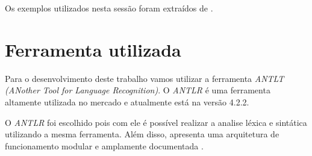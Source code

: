 \documentclass[12pt]{article}
\begin{document}
Os exemplos utilizados nesta sessão foram extraídos de \cite{W3Schools}.

\section{Ferramenta utilizada}

Para o desenvolvimento deste trabalho vamos utilizar a ferramenta \textit{ANTLT (ANother Tool for Language Recognition)}. O \textit{ANTLR} é uma ferramenta altamente utilizada no mercado e atualmente está na versão 4.2.2.

O \textit{ANTLR} foi escolhido pois com ele é possível realizar a analise léxica e sintática utilizando a mesma ferramenta. Além disso, apresenta uma arquitetura de funcionamento modular e amplamente documentada \cite{ANTLR}.



\end{document}

